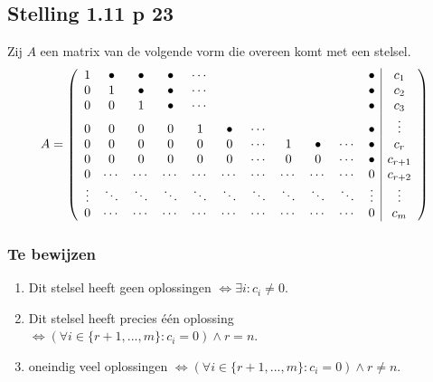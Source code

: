 \documentclass[lineaire_algebra_oplossingen.tex]{subfiles}
\begin{document}
\subsection{Stelling 1.11 p 23}
Zij $A$ een matrix van de volgende vorm die overeen komt met een stelsel.
\[
A =
\left(
\begin{array}{c c c c c c c c c c  c | c}
1 & \bullet & \bullet & \bullet & \cdots & & & & & & \bullet & c_1\\
0 & 1 & \bullet & \bullet & \cdots & & & & & & \bullet & c_2\\
0 & 0 & 1 & \bullet & \cdots & & & & & & \bullet & c_3\\
0 & 0 & 0 & 0 & 1 & \bullet & \cdots & & & & \bullet & \vdots\\
0 & 0 & 0 & 0 & 0 & 0 & \cdots & 1 & \bullet & \cdots  & \bullet & c_r\\
0 & 0 & 0 & 0 & 0 & 0 & \cdots & 0 & 0 & \cdots & \bullet & c_{r+1}\\
0 & \cdots & \cdots & \cdots & \cdots & \cdots & \cdots & \cdots & \cdots & \cdots & 0 & c_{r+2}\\
\vdots & \ddots& \ddots& \ddots& \ddots& \ddots& \ddots& \ddots& \ddots & \ddots & \vdots & \vdots\\
0 & \cdots & \cdots & \cdots & \cdots & \cdots & \cdots & \cdots & \cdots & \cdots & 0 & c_{m}\\
\end{array}
\right)
\]
\subsubsection*{Te bewijzen}
\begin{enumerate}
\item Dit stelsel heeft geen oplossingen $\Leftrightarrow \exists i: c_i \neq 0$.
\item Dit stelsel heeft precies één oplossing $\Leftrightarrow (\forall i \in \{r+1,...,m\}: c_i=0) \wedge r=n$. 
\item oneindig veel oplossingen $\Leftrightarrow (\forall i \in \{r+1,...,m\}: c_i=0) \wedge r\neq n$.
\end{enumerate}
\end{document}

